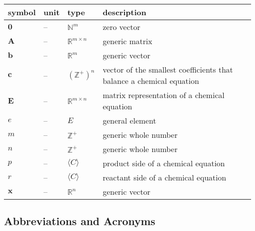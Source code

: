 \documentclass[12pt]{article}
\begin{document}
\noindent \begin{tabularx}{\textwidth}{l l l X} \toprule
  \textbf{symbol} & \textbf{unit} & \textbf{type}             & \textbf{description}                             \\
  \midrule
  $\textbf{0}$    & --            & $\mathbb{N}^{m}$          & zero vector                                      \\
  $\textbf{A}$    & --            & $\mathbb{R}^{m \times n}$ & generic matrix                                   \\
  $\textbf{b}$    & --            & $\mathbb{R}^{m}$          & generic vector                                   \\
  $\textbf{c}$    & --            & $(\mathbb{Z^+})^{n}$      & vector of the smallest coefficients that balance
  a chemical equation                                                                                            \\
  $\textbf{E}$    & --            & $\mathbb{R}^{m \times n}$ & matrix representation of a chemical equation     \\
  $e$             & --            & $E$                       & general element                                  \\
  $m$             & --            & $\mathbb{Z}^+$            & generic whole number                             \\
  $n$             & --            & $\mathbb{Z}^+$            & generic whole number                             \\
  $p$             & --            & $\langle C \rangle$       & product side of a chemical equation              \\
  $r$             & --            & $\langle C \rangle$       & reactant side of a chemical equation             \\
  $\textbf{x}$    & --            & $\mathbb{R}^{n}$          & generic vector                                   \\
  \bottomrule
\end{tabularx}

\subsection{Abbreviations and Acronyms} \label{srs_sec_abbsAcrs}
\end{document}
